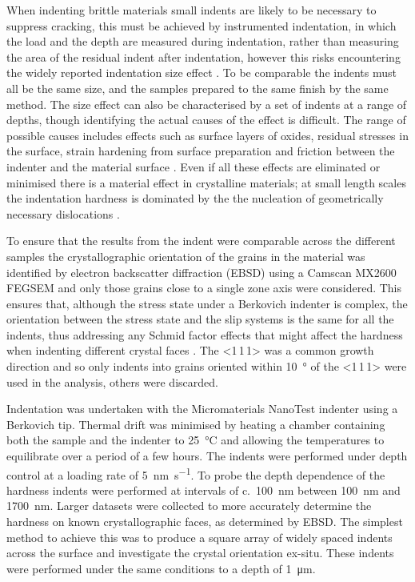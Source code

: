When indenting brittle materials small indents are likely to be necessary to suppress cracking, this must be achieved by instrumented indentation, in which the load and the depth are measured during indentation, rather than measuring the area of the residual indent after indentation, however this risks encountering the widely reported indentation size effect \cite{Korte2009,Cripps2011}. To be comparable the indents must all be the same size, and the samples prepared to the same finish by the same method. The size effect can also be characterised by a set of indents at a range of depths, though identifying the actual causes of the effect is difficult. The range of possible causes includes effects such as surface layers of oxides, residual stresses in the surface, strain hardening from surface preparation and friction between the indenter and the material surface \cite{Cripps2011}. Even if all these effects are eliminated or minimised there is a material effect in crystalline materials; at small length scales the indentation hardness is dominated by the the nucleation of geometrically necessary dislocations \cite{Cripps2011}.






To ensure that the results from the indent were comparable across the different samples the crystallographic orientation of the grains in the material was identified by electron backscatter diffraction (EBSD) using a Camscan MX2600 FEGSEM and only those grains close to a single zone axis were considered. This ensures that, although the stress state under a Berkovich indenter is complex, the orientation between the stress state and the slip systems is the same for all the indents, thus addressing any Schmid factor effects that might affect the hardness when indenting different crystal faces \cite{Kelly2012ch7}. The <1\,1\,1> was a common growth direction and so only indents into grains oriented within \SI{10}{\degree} of the <1\,1\,1> were used in the analysis, others were discarded.


Indentation was undertaken with the Micromaterials NanoTest indenter using a Berkovich tip. Thermal drift was minimised by heating a chamber containing both the sample and the indenter to \SI{25}{\celsius} and allowing the temperatures to equilibrate over a period of a few hours. The indents were performed under depth control at a loading rate of \SI{5}{\nano\meter\per\second}. To probe the depth dependence of the hardness indents were performed at intervals of c.~\SI{100}{\nano\meter} between \SI{100}{\nano\meter} and \SI{1700}{\nano\meter}. Larger datasets were collected to more accurately determine the hardness on known crystallographic faces, as determined by EBSD. The simplest method to achieve this was to produce a square array of widely spaced indents across the surface and investigate the crystal orientation ex-situ. These indents were performed under the same conditions to a depth of \SI{1}{\micro\meter}.


